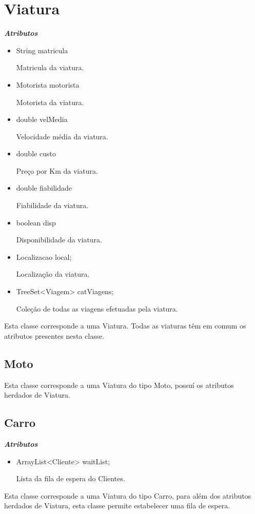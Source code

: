 \documentclass[12pt,a4paper]{report}
\begin{document}
\section{Viatura}
\emph{\bfseries Atributos}
\begin{itemize}
    \item String matricula \par
Matricula da viatura.
    \item Motorista motorista \par
Motorista da viatura.
    \item double velMedia \par
Velocidade média da viatura.
    \item double custo \par
Preço por Km da viatura.
    \item double fiabilidade \par
Fiabilidade da viatura.
    \item boolean disp \par
Disponibilidade da viatura.
    \item Localizacao local; \par
Localização da viatura.
    \item   TreeSet<Viagem> catViagens; \par
Coleção de todas as viagens efetuadas pela viatura. 

\end{itemize}

Esta classe corresponde a uma Viatura. Todas as viaturas têm em comum os atributos presentes nesta classe. 

\subsection{Moto}
Esta classe corresponde a uma Viatura do tipo Moto, possuí os atributos herdados de Viatura. 

\subsection{Carro}
\emph{\bfseries Atributos}
\begin{itemize}
    \item ArrayList<Cliente> waitList; \par
Lista da fila de espera do Clientes.	
\end{itemize}
Esta classe corresponde a uma Viatura do tipo Carro, para além dos atributos herdados de Viatura, esta classe permite estabelecer uma fila de espera. 
\end{document}
